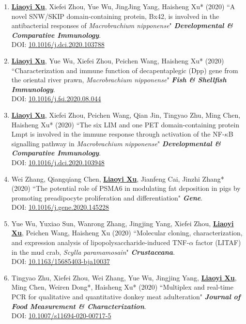 \documentclass[12pt]{article}
\begin{document}
\begin{enumerate}
  \leftskip-0.13in %
  \item \textbf{\underline{Liaoyi Xu}}, Xiefei Zhou, Yue Wu, JingJing Yang, Haisheng Xu* (2020) ``A novel SNW/SKIP domain-containing protein, Bx42, is involved in the antibacterial responses of \textit{Macrobrachium nipponense}" \textbf{\textit{Developmental \& Comparative Immunology}}. \\
  DOI: \href{https://doi.org/10.1016/j.dci.2020.103788}{10.1016/j.dci.2020.103788}

  \item \textbf{\underline{Liaoyi Xu}}, Yue Wu, Xiefei Zhou, Peichen Wang, Haisheng Xu* (2020) ``Characterization and immune function of decapentaplegic (Dpp) gene from the oriental river prawn, \textit{Macrobrachium nipponense}" \textbf{\textit{Fish \& Shellfish Immunology}}. \\  
  DOI: \href{https://doi.org/10.1016/j.fsi.2020.08.044}{10.1016/j.fsi.2020.08.044}
  
  \item \textbf{\underline{Liaoyi Xu}}, Xiefei Zhou, Peichen Wang, Qian Jin, Tingyao Zhu, Ming Chen, Haisheng Xu* (2020) ``The six LIM and one PET domain-containing protein Lmpt is involved in the immune response through activation of the NF-$\kappa$B signalling pathway in \textit{Macrobrachium nipponense}" \textbf{\textit{Developmental \& Comparative Immunology}}. \\
  DOI: \href{https://doi.org/10.1016/j.dci.2020.103948}{10.1016/j.dci.2020.103948}

  \item Wei Zhang, Qiangqiang Chen, \textbf{\underline{Liaoyi Xu}}, Jianfeng Cai, Jinzhi Zhang* (2020) ``The potential role of PSMA6 in modulating fat deposition in pigs by promoting preadipocyte proliferation and differentiation" \textbf{\textit{Gene}}. \\
  DOI: \href{https://doi.org/10.1016/j.gene.2020.145228}{10.1016/j.gene.2020.145228}

  \item Yue Wu, Yuxiao Sun, Wanrong Zhang, Jingjing Yang, Xiefei Zhou, \textbf{\underline{Liaoyi Xu}}, Peichen Wang, Haisheng Xu (2020) ``Molecular cloning, characterization, and expression analysis of lipopolysaccharide-induced TNF-$\alpha$ factor (LITAF) in the mud crab, \textit{Scylla paramamosain}" \textbf{\textit{Crustaceana}}. \\
  DOI: \href{https://doi.org/10.1163/15685403-bja10037}{10.1163/15685403-bja10037}
  
  \item Tingyao Zhu, Xiefei Zhou, Wei Zhang, Yue Wu, Jingjing Yang, \textbf{\underline{Liaoyi Xu}}, Ming Chen, Weiren Dong*, Haisheng Xu* (2020) ``Multiplex and real-time PCR for qualitative and quantitative donkey meat adulteration" \textbf{\textit{Journal of Food Measurement \& Characterization}}. \\
  DOI: \href{https://doi.org/10.1007/s11694-020-00717-5}{10.1007/s11694-020-00717-5}  

\end{enumerate}
\end{document}
